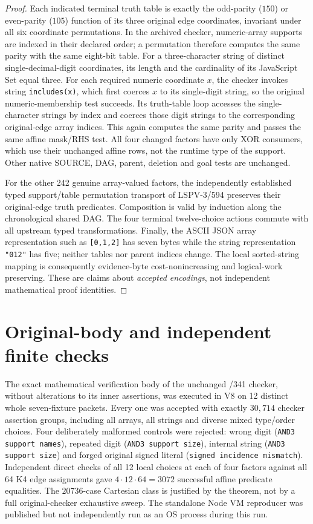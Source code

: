 \documentclass[11pt]{article}
\begin{document}
\begin{proof}
Each indicated terminal truth table is exactly the odd-parity ($150$) or even-parity ($105$) function of its three original edge coordinates, invariant under all six coordinate permutations. In the archived checker, numeric-array supports are indexed in their declared order; a permutation therefore computes the same parity with the same eight-bit table. For a three-character string of distinct single-decimal-digit coordinates, its length and the cardinality of its JavaScript Set equal three. For each required numeric coordinate $x$, the checker invokes string \texttt{includes(x)}, which first coerces $x$ to its single-digit string, so the original numeric-membership test succeeds. Its truth-table loop accesses the single-character strings by index and coerces those digit strings to the corresponding original-edge array indices. This again computes the same parity and passes the same affine mask/RHS test. All four changed factors have only XOR consumers, which use their unchanged affine rows, not the runtime type of the support. Other native SOURCE, DAG, parent, deletion and goal tests are unchanged.

For the other 242 genuine array-valued factors, the independently established typed support/table permutation transport of LSPV-3/594 preserves their original-edge truth predicates. Composition is valid by induction along the chronological shared DAG. The four terminal twelve-choice actions commute with all upstream typed transformations. Finally, the ASCII JSON array representation such as \texttt{[0,1,2]} has seven bytes while the string representation \texttt{"012"} has five; neither tables nor parent indices change. The local sorted-string mapping is consequently evidence-byte cost-nonincreasing and logical-work preserving. These are claims about \emph{accepted encodings}, not independent mathematical proof identities.
\end{proof}

\section*{Original-body and independent finite checks}
The exact mathematical verification body of the unchanged /341 checker, without alterations to its inner assertions, was executed in V8 on 12 distinct whole seven-fixture packets. Every one was accepted with exactly $30{,}714$ checker assertion groups, including all arrays, all strings and diverse mixed type/order choices. Four deliberately malformed controls were rejected: wrong digit (\texttt{AND3 support names}), repeated digit (\texttt{AND3 support size}), internal string (\texttt{AND3 support size}) and forged original signed literal (\texttt{signed incidence mismatch}). Independent direct checks of all 12 local choices at each of four factors against all 64 K4 edge assignments gave $4\cdot12\cdot64=3072$ successful affine predicate equalities. The $20736$-case Cartesian class is justified by the theorem, not by a full original-checker exhaustive sweep. The standalone Node VM reproducer was published but not independently run as an OS process during this run.
\end{document}
